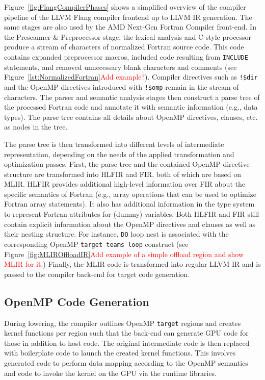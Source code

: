 \documentclass[acmtog,natbib=false]{acmart}
\newcommand{\todo}[1]{\textcolor{red}{#1}}
\newcommand{\code}[1]{\texttt{#1}\xspace}
\begin{document}
Figure~\ref{fig:FlangCompilerPhases} shows a simplified overview of the compiler pipeline of the LLVM Flang compiler frontend up to LLVM \ac{IR} generation.
The same stages are also used by the AMD Next-Gen Fortran Compiler front-end.
In the Prescanner \& Preprocessor stage, the lexical analysis and C-style processor produce a stream of characters of normalized Fortran source code. 
This code contains expanded preprocessor macros, included code resulting from \code{INCLUDE} statements, and removed unnecessary blank characters and comments (see Figure~\ref{lst:NormalizedFortran}\todo{Add example?}).
Compiler directives such as \code{!\$dir} and the OpenMP directives introduced with \code{!\$omp} remain in the stream of characters.
The parser and semantic analysis stages then construct a parse tree of the processed Fortran code and annotate it with semantic information (e.g., data types).
The parse tree contains all details about OpenMP directives, clauses, etc. as nodes in the tree.

The parse tree is then transformed into different levels of intermediate representation, depending on the needs of the applied transformation and optimization passes.
First, the parse tree and the contained OpenMP directive structure are transformed into \ac{HLFIR} and \ac{FIR}, both of which are based on \ac{MLIR}.
\Ac{HLFIR} provides additional high-level information over \ac{FIR} about the specific semantics of Fortran (e.g., array operations that can be used to optimize Fortran array statements).
It also has additional information in the type system to represent Fortran attributes for (dummy) variables.
Both \ac{HLFIR} and \ac{FIR} still contain explicit information about the OpenMP directives and clauses as well as their nesting structure.
For instance, \code{DO} loop nest is associated with the corresponding OpenMP \code{target teams loop} construct (see Figure~\ref{fig:MLIROffloadIR}\todo{Add example of a simple offload region and show MLIR for it.})
Finally, the \ac{MLIR} code is transformed into regular LLVM \ac{IR} and is passed to the compiler back-end for target code generation.


\subsection{OpenMP Code Generation}
\label{sec:OpenMPCodeGen}

During lowering, the compiler outlines OpenMP \code{target} regions and creates kernel functions per region such that the back-end can generate \ac{GPU} code for those in addition to host code.
The original intermediate code is then replaced with boilerplate code to launch the created kernel functions.
This involves generated code to perform data mapping according to the OpenMP semantics and code to invoke the kernel on the GPU via the runtime libraries.
\end{document}
